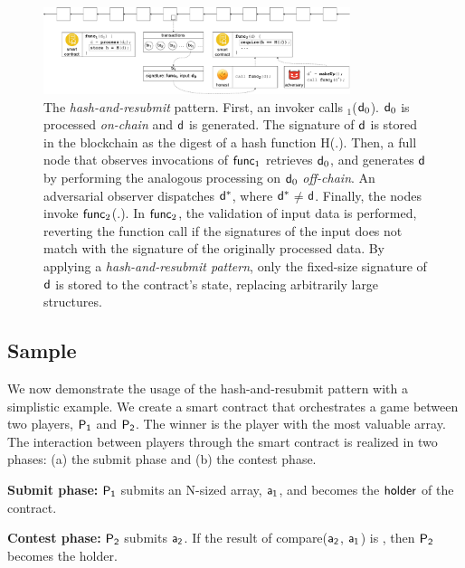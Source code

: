 \begin{figure}[h]
    \begin{center} \includegraphics[width=0.8\textwidth]{figures/har-pattern.pdf}
    \end{center}

    \caption{The \emph{hash-and-resubmit} pattern. First, an invoker calls
        \proc$_1$($\mathsf{d}_0$). $\mathsf{d}_0$ is processed \emph{on-chain} and
        $\mathsf{d}$ is generated. The signature of $\mathsf{d}$ is stored in the
        blockchain as the digest of a hash function \textsf{H}(.). Then,
        a full node that observes invocations of $\textsf{func}_1$ retrieves $\mathsf{d}_0$,
        and generates $\mathsf{d}$ by performing the analogous processing on
        $\mathsf{d}_0$ \emph{off-chain}. An adversarial observer dispatches
        $\mathsf{d^*}$, where $\mathsf{d^*}$$\neq$$\mathsf{d}$. Finally, the nodes invoke
        $\textsf{func}_2$(.). In $\textsf{func}_2$, the validation of input data is performed,
        reverting the function call if the signatures of the input does not
        match with the signature of the originally processed data. By applying
        a \emph{hash-and-resubmit pattern}, only the fixed-size signature of
        $\mathsf{d}$ is stored to the contract's state, replacing arbitrarily large
        structures.}

        \label{fig:har-pattern}
\end{figure}


\subsection{Sample} We now demonstrate the usage of the
hash-and-resubmit pattern with a simplistic example. We create a smart contract
that orchestrates a game between two players, $\mathsf{P_1}$ and $\mathsf{P_2}$. The winner is
the player with the most valuable array. The interaction between players
through the smart contract is realized in two phases: (a) the submit phase and
(b) the contest phase.

\noindent\textbf{Submit phase:} $\mathsf{P_1}$ submits an N-sized array, $\mathsf{a_1}$, and
becomes the $\mathsf{holder}$ of the contract.

\noindent\textbf{Contest phase:} $\mathsf{P_2}$ submits $\mathsf{a_2}$. If the result of
\textsf{compare}($\mathsf{a_2}$, $\mathsf{a_1}$) is \true, then $\mathsf{P_2}$ becomes the holder.

